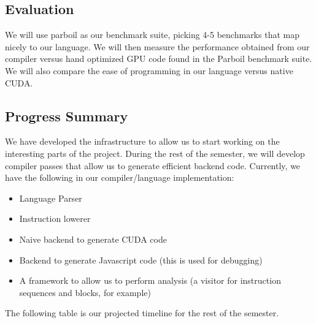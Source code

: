\subsection{Evaluation}\label{evaluation}

We will use parboil as our benchmark suite, picking 4-5 benchmarks that
map nicely to our language. We will then measure the performance
obtained from our compiler versus hand optimized GPU code found in the
Parboil benchmark suite. We will also compare the ease of programming in
our language versus native CUDA.

\subsection{Progress Summary}\label{progress-summary}

We have developed the infrastructure to allow us to start working on the
interesting parts of the project. During the rest of the semester, we
will develop compiler passes that allow us to generate efficient backend
code. Currently, we have the following in our compiler/language
implementation:

\begin{itemize}
\itemsep1pt\parskip0pt
\item
  Language Parser
\item
  Instruction lowerer
\item
  Naive backend to generate CUDA code
\item
  Backend to generate Javascript code (this is used for debugging)
\item
  A framework to allow us to perform analysis (a visitor for instruction
  sequences and blocks, for example)
\end{itemize}

The following table is our projected timeline for the rest of the
semester.

